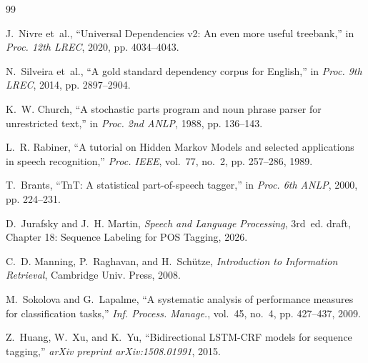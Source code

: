 \documentclass[conference]{IEEEtran}
\begin{document}

\begin{thebibliography}{99}

J.~Nivre et~al., ``Universal Dependencies v2: An even more useful treebank,'' in \emph{Proc. 12th LREC}, 2020, pp. 4034--4043.

N.~Silveira et~al., ``A gold standard dependency corpus for English,'' in \emph{Proc. 9th LREC}, 2014, pp. 2897--2904.

K.~W. Church, ``A stochastic parts program and noun phrase parser for unrestricted text,'' in \emph{Proc. 2nd ANLP}, 1988, pp. 136--143.

L.~R. Rabiner, ``A tutorial on Hidden Markov Models and selected applications in speech recognition,'' \emph{Proc. IEEE}, vol.~77, no.~2, pp. 257--286, 1989.

T.~Brants, ``TnT: A statistical part-of-speech tagger,'' in \emph{Proc. 6th ANLP}, 2000, pp. 224--231.

D.~Jurafsky and J.~H. Martin, \emph{Speech and Language Processing}, 3rd~ed. draft, Chapter 18: Sequence Labeling for POS Tagging, 2026.

C.~D. Manning, P.~Raghavan, and H.~Sch{\"u}tze, \emph{Introduction to Information Retrieval}, Cambridge Univ. Press, 2008.

M.~Sokolova and G.~Lapalme, ``A systematic analysis of performance measures for classification tasks,'' \emph{Inf. Process. Manage.}, vol.~45, no.~4, pp. 427--437, 2009.

Z.~Huang, W.~Xu, and K.~Yu, ``Bidirectional LSTM-CRF models for sequence tagging,'' \emph{arXiv preprint arXiv:1508.01991}, 2015.

\end{thebibliography}
\end{document}
